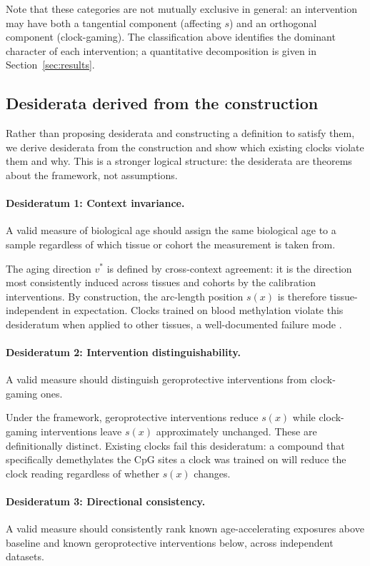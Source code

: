 Note that these categories are not mutually exclusive in general: an intervention
may have both a tangential component (affecting $s$) and an orthogonal component
(clock-gaming). The classification above identifies the dominant character of each
intervention; a quantitative decomposition is given in Section~\ref{sec:results}.

\subsection{Desiderata derived from the construction}
\label{sec:desiderata}

Rather than proposing desiderata and constructing a definition to satisfy them,
we derive desiderata from the construction and show which existing clocks violate
them and why. This is a stronger logical structure: the desiderata are theorems
about the framework, not assumptions.

\paragraph{Desideratum 1: Context invariance.}
A valid measure of biological age should assign the same biological age to a sample
regardless of which tissue or cohort the measurement is taken from.

The aging direction $v^*$ is defined by cross-context agreement: it is the direction
most consistently induced across tissues and cohorts by the calibration interventions.
By construction, the arc-length position $s(x)$ is therefore tissue-independent in
expectation. Clocks trained on blood methylation violate this desideratum when applied
to other tissues, a well-documented failure mode \cite{horvath2013}.

\paragraph{Desideratum 2: Intervention distinguishability.}
A valid measure should distinguish geroprotective interventions from clock-gaming ones.

Under the framework, geroprotective interventions reduce $s(x)$ while clock-gaming
interventions leave $s(x)$ approximately unchanged. These are definitionally distinct.
Existing clocks fail this desideratum: a compound that specifically demethylates
the CpG sites a clock was trained on will reduce the clock reading regardless of
whether $s(x)$ changes.

\paragraph{Desideratum 3: Directional consistency.}
A valid measure should consistently rank known age-accelerating exposures above
baseline and known geroprotective interventions below, across independent datasets.

